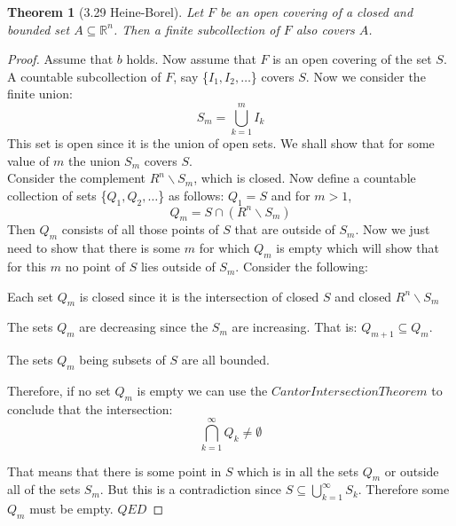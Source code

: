 \documentclass[aps,pra,notitlepage,amsmath,amssymb,letterpaper,12pt]{revtex4-1}
\newtheorem{theorem}{Theorem}
\begin{document}
\begin{theorem}[3.29 Heine-Borel]
Let $F$ be an open covering of a closed and bounded set $A \subseteq \mathbb{R}^n$. Then a finite subcollection of $F$ also covers $A$.
\end{theorem}
\begin{proof}
Assume that \(b\) holds.  Now assume that \(F\) is an open covering of the set \(S\). A countable subcollection of \(F\), say \{\(I_1,I_2,\ldots\)\} covers \(S\).  Now we consider the finite union:
\[S_m = \bigcup\limits_{k=1}^{m} I_k\]
This set is open since it is the union of open sets.  We shall show that for some value of \(m\) the union \(S_m\) covers \(S\). \\
Consider the complement \(R^n \backslash S_m\), which is closed.  Now define a countable collection of sets \{\(Q_1,Q_2, \ldots\)\} as follows: \(Q_1 = S\) and for \(m>1\),
\[Q_m = S\cap (R^n\backslash S_m)\]
Then \(Q_m\) consists of all those points of \(S\) that are outside of \(S_m\).  Now we just need to show that there is some \(m\) for which \(Q_m\) is empty which will show that for this \(m\) no point of \(S\) lies outside of \(S_m\).
Consider the following: 

    Each set \(Q_m\) is closed since it is the intersection of closed \(S\) and closed \(R^n\backslash S_m\)
    
        The sets \(Q_m\) are decreasing since the \(S_m\) are increasing.  That is: \(Q_{m+1}\subseteq Q_m\). 
        
        The sets \(Q_m\) being subsets of \(S\) are all bounded.
        
        Therefore, if no set \(Q_m\) is empty we can use the \(Cantor Intersection Theorem\) to conclude that the intersection:
\[\bigcap\limits_{k=1}^{\infty} Q_k \neq \emptyset\]

    That means that there is some point in \(S\) which is in all the sets \(Q_m\) or outside all of the sets \(S_m\).  But this is a contradiction since \(S\subseteq \bigcup\limits_{k=1}^{\infty} S_k\).  Therefore some \(Q_m\) must be empty.  \(QED\)
\end{proof}
\end{document}
